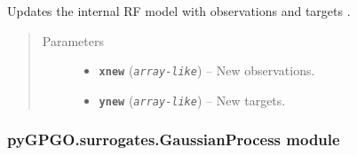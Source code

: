 \documentclass[letterpaper,10pt,english]{sphinxmanual}
\begin{document}
\begin{fulllineitems}

\begin{fulllineitems}
\label{pyGPGO.surrogates.BoostedTrees:pyGPGO.surrogates.BoostedTrees.BoostedTrees.update}
Updates the internal RF model with observations  and targets .
\begin{quote}\begin{description}
\item[{Parameters}] \leavevmode\begin{itemize}
\item {} 
\textbf{\texttt{xnew}} (\emph{\texttt{array-like}}) -- New observations.

\item {} 
\textbf{\texttt{ynew}} (\emph{\texttt{array-like}}) -- New targets.

\end{itemize}

\end{description}\end{quote}

\end{fulllineitems}


\end{fulllineitems}



\subsubsection{pyGPGO.surrogates.GaussianProcess module}
\label{pyGPGO.surrogates.GaussianProcess:module-pyGPGO.surrogates.GaussianProcess}\label{pyGPGO.surrogates.GaussianProcess::doc}\label{pyGPGO.surrogates.GaussianProcess:pygpgo-surrogates-gaussianprocess-module}
\end{document}
